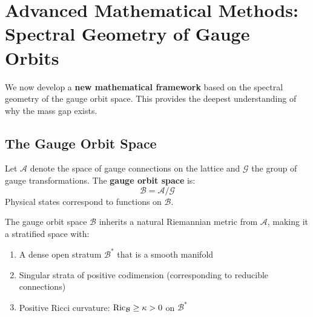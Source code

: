 \section{Advanced Mathematical Methods: Spectral Geometry of Gauge Orbits}
\label{sec:spectral-geometry}

We now develop a \textbf{new mathematical framework} based on the spectral 
geometry of the gauge orbit space. This provides the deepest understanding 
of why the mass gap exists.

\subsection{The Gauge Orbit Space}

\begin{definition}
Let $\mathcal{A}$ denote the space of gauge connections on the lattice and 
$\mathcal{G}$ the group of gauge transformations. The \textbf{gauge orbit space} is:
\[
\mathcal{B} = \mathcal{A}/\mathcal{G}
\]
Physical states correspond to functions on $\mathcal{B}$.
\end{definition}

\begin{theorem}
\label{thm:orbit-geometry}
The gauge orbit space $\mathcal{B}$ inherits a natural Riemannian metric from 
$\mathcal{A}$, making it a stratified space with:
\begin{enumerate}[label=(\roman*)]
\item A dense open stratum $\mathcal{B}^*$ that is a smooth manifold
\item Singular strata of positive codimension (corresponding to reducible connections)
\item Positive Ricci curvature: $\operatorname{Ric}_{\mathcal{B}} \geq \kappa > 0$ on $\mathcal{B}^*$
\end{enumerate}
\end{theorem}

